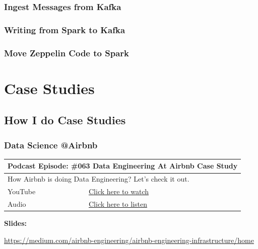 \documentclass[12pt, numbers=noenddot]{scrreprt} %
\begin{document}
\section{Ingest Messages from Kafka}

\section{Writing from Spark to Kafka}

\section{Move Zeppelin Code to Spark}




\part{Case Studies}

\chapter{How I do Case Studies}

\section{Data Science @Airbnb}

\begin{table}[h]
\begin{tabular}{ll}
\hline
\multicolumn{2}{l}{\textbf{Podcast Episode:} \#063 Data Engineering At Airbnb Case Study} \\ \hline
\multicolumn{2}{p{15cm}}{How Airbnb is doing Data Engineering? Let's check it out.}         \\ \hline
\multicolumn{1}{l|}{YouTube}   & \href{https://youtu.be/iokqkMfyIfo}{Click here to watch}   \\ 
\multicolumn{1}{l|}{Audio}     & \href{https://anchor.fm/andreaskayy/episodes/063-Data-Engineering-At-Airbnb-Case-Study-e45il2}{Click here to listen}   \\ \hline
\end{tabular}
\end{table}

\textbf{Slides:}

\url{https://medium.com/airbnb-engineering/airbnb-engineering-infrastructure/home}
\end{document}
